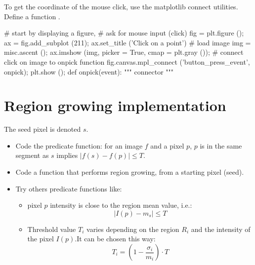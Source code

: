\begin{pcomment}
To get the coordinate of the mouse click, use the matplotlib connect utilities. Define a function .
\begin{python}
# start by displaying a figure, 
# ask for mouse input (click)
fig = plt.figure ();
ax = fig.add_subplot (211);
ax.set_title ('Click on a point')
# load image
img = misc.ascent ();
ax.imshow (img, picker = True, cmap = plt.gray ());
# connect click on image to onpick function
fig.canvas.mpl_connect ('button_press_event', onpick);
plt.show ();
def onpick(event):
    """ connector """
\end{python}
\end{pcomment}


\section{Region growing implementation}
\begin{qbox}
The seed pixel is denoted $s$.
\begin{itemize}
 \item Code the predicate function: for an image $f$ and a pixel $p$, $p$ is in the same segment as $s$ implies $|f(s)-f(p)|\leq T$.
 \item Code a function that performs region growing, from a starting pixel (seed).
 \item Try others predicate functions like:
 \begin{itemize}
  \item pixel $p$ intensity is close to the region mean value, i.e.: $$ |I(p)-m_s|\leq T$$
  \item Threshold value $T_i$ varies depending on the region $R_i$ and the intensity of the pixel $I(p)$.It can be chosen this way:
$$T_i=(1-\frac{\sigma_i}{m_i})\cdot T$$
 \end{itemize}

\end{itemize}

\end{qbox}

